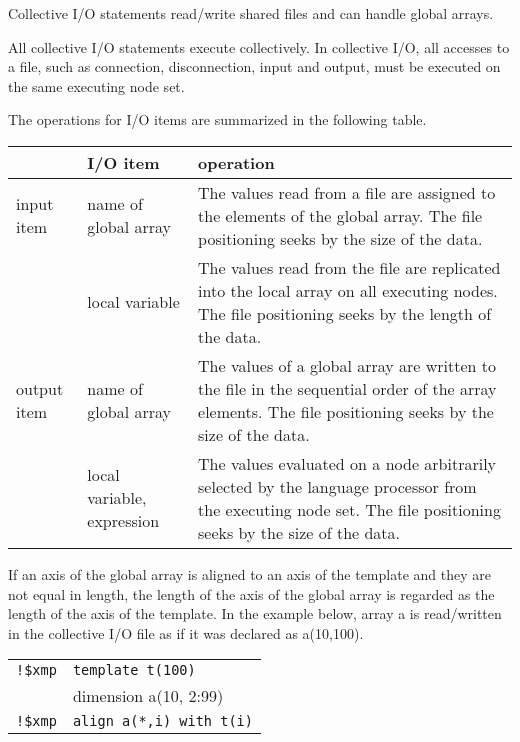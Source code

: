    Collective I/O statements read/write shared files and can handle global arrays.

   All collective I/O statements execute collectively.
   In collective I/O, all accesses to a file, such as connection, disconnection,
   input and output, must be executed on the same executing node set. 
   
   The operations for I/O items are summarized in the following table.

   \begin{table}[h]
    \begin{center}
     \begin{tabular}{|p{10mm}|l|p{100mm}|}
      \hline
      \multicolumn{1}{|c}{ }  & {\bf I/O item} & {\bf operation} \\ \hline
      input item & name of global array & The values read from a file are assigned to the elements of the global array.
      The file positioning seeks by the size of the data.
      \\ \cline{2-3}
      & local variable &  The values read from the file are replicated into the
	      local array on all executing nodes. The file positioning seeks by
	      the length of the data.
      \\ \hline
      output item & name of global array & The values of a global array are
      written to the file in the sequential order of the array elements.
      The file positioning seeks by the size of the data.
      \\ \cline{2-3}
      & local variable, expression & The values evaluated on a node arbitrarily selected by the language processor from the executing node set.
      The file positioning seeks by the size of the data.
      \\ \hline
      \end{tabular}
     \end{center}
    \label{tb:aaa}
   \end{table}

   If an axis of the global array is aligned to an axis of the template and they are not equal in length, the length of the axis of the global array is regarded as the length of the axis of the template. In the example below, array a is read/written in the collective I/O file as if it was declared as a(10,100).\\
   \begin{tabular}{ll}
     \verb|!$xmp| & \verb|template t(100)| \\
     & dimension a(10, 2:99) \\
     \verb|!$xmp| & \verb|align a(*,i) with t(i)| \\
   \end{tabular}
\fi
   
